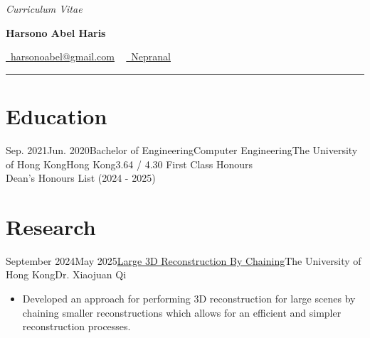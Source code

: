 \documentclass{cv}
\begin{document}
	\begin{center}
        \textit{Curriculum Vitae}\\
		{\Large \textbf{Harsono Abel Haris}\par}
		\href{mailto:harsonoabel@gmail.com}{\raisebox{-0.2\height}\faEnvelope\  harsonoabel@gmail.com} ~ 
        \href{https://github.com/Nepranal/notes}{\raisebox{-0.2\height}\faGithub\ Nepranal}
	\end{center}
	\vspace{-0.15in}
	\rule{\textwidth}{1pt}
	\vspace{0.05in}

%
%
%

	\section*{Education}
	\begin{education}{Sep. 2021}{Jun. 2020}{Bachelor of Engineering}{Computer Engineering}{The University of Hong Kong}{Hong Kong}{3.64 / 4.30}
	   First Class Honours\\
       Dean's Honours List (2024 - 2025)
	\end{education}
	\vspace{0.2in}
	
%
%
%
	
	\section*{Research}
	\begin{research_exp}{September 2024}{May 2025}{\href{https://github.com/Nepranal/chained-reconstructions}{Large 3D Reconstruction By Chaining}}{The University of Hong Kong}{Dr. Xiaojuan Qi}
		\begin{itemize}
    	    \item Developed an approach for performing 3D reconstruction for large scenes by chaining smaller reconstructions which allows for an efficient and simpler reconstruction processes.
        \end{itemize}
	\end{research_exp}
    \vspace{0.2in}
\end{document}
